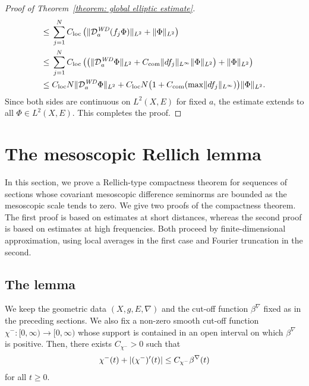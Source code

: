 \documentclass[a4paper,oneside,12pt]{amsart}
\theoremstyle{plain}
\theoremstyle{definition}
\theoremstyle{remark}
\DeclarePairedDelimiter{\abs}{\lvert}{\rvert}
\DeclarePairedDelimiter{\norm}{\lVert}{\rVert}
\newcommand{\Ltwonorm}[2][L^2]{\norm{#2}_{#1}}
\newcommand{\mesoscopicWilsonDiracoperator}[1][a]{\mathcal{D}_{#1}^{\mathit{WD}}}
\newcommand{\cutoff}{\beta}
\newcommand{\cutoffnabla}{\cutoff^{\nabla}}
\newcommand{\cutofflower}{\chi^-}
\newcommand{\constantlocal}{C_{\mathrm{loc}}}
\newcommand{\constantcommutator}{C_{\mathrm{com}}}
\begin{document}
\begin{proof}[Proof of Theorem~\ref{theorem: global elliptic estimate}]
\begin{equation}
\begin{aligned}
    \le{}& \sum_{j=1}^N \constantlocal \left( \Ltwonorm{\mesoscopicWilsonDiracoperator(f_j \Phi)} + \Ltwonorm{\Phi} \right) \\
    \le{}& \sum_{j=1}^N \constantlocal \left( \big( \Ltwonorm{\mesoscopicWilsonDiracoperator \Phi} + \constantcommutator \norm{df_j}_{L^{\infty}} \Ltwonorm{\Phi} \big) + \Ltwonorm{\Phi} \right) \\
    \le{}& \constantlocal N \Ltwonorm{\mesoscopicWilsonDiracoperator \Phi} +  \constantlocal N \big(1 + \constantcommutator (\max \norm{df_j}_{L^{\infty}})\big) \Ltwonorm{\Phi}.
    \end{aligned}
  \end{equation}
  Since both sides are continuous on $L^2(X,E)$ for fixed $a$, the estimate extends to all $\Phi \in L^2(X,E)$.
  This completes the proof.
\end{proof}

\section{The mesoscopic Rellich lemma}\label{section: the mesoscopic rellich lemma}

In this section, we prove a Rellich-type compactness theorem for sequences of sections whose covariant mesoscopic difference seminorms are bounded as the mesoscopic scale tends to zero.
We give two proofs of the compactness theorem.
The first proof is based on estimates at short distances, whereas the second proof is based on estimates at high frequencies.
Both proceed by finite-dimensional approximation, using local averages in the first case and Fourier truncation in the second.

\subsection{The lemma}

We keep the geometric data $(X,g,E,\nabla)$ and the cut-off function $\cutoffnabla$ fixed as in the preceding sections.
We also fix a non-zero smooth cut-off function $\cutofflower \colon [0,\infty) \to [0,\infty)$ whose support is contained in an open interval on which $\cutoffnabla$ is positive.
Then, there exists $C_{\cutofflower} > 0$ such that
\begin{equation}
  \cutofflower(t) + \abs{(\cutofflower)'(t)} \le C_{\cutofflower} \cutoffnabla(t)
\end{equation}
for all $t \ge 0$.
\end{document}
